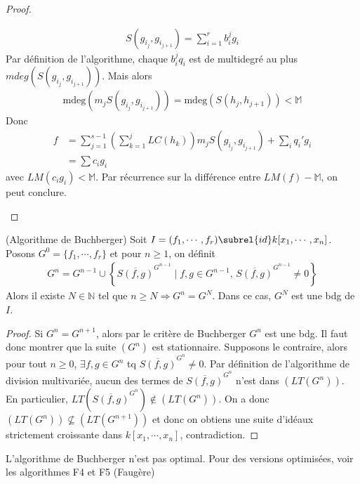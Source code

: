 \begin{proof}
\begin{enumerate}
                \begin{align*}
                    S(g_{i_j}, g_{i_{j+1}}) = \sum_{i = 1}^r b_i^jg_i
                \end{align*}
                Par définition de l'algorithme, chaque $b_i^jq_i$ est de multidegré au plus $mdeg(S(g_{i_j}, g_{i_{j+1}}))$. Mais alors
                \begin{align*}
                    \mathrm{mdeg}(m_j S(g_{i_j}, g_{i_{j+1}})) = \mathrm{mdeg}(S(h_j,h_{j+1})) < \mathbb{M}
                \end{align*}
                Donc
                \begin{align*}
                    f &= \sum_{j = 1}^{s-1} \left(\sum_{k = 1}^j LC(h_k) \right) m_j S(g_{i_j},g_{i_{j+1}}) + \sum_i q_i'g_i \\        
                    &= \sum c_ig_i                
                \end{align*}
                avec $LM(c_ig_i) < \mathbb{M}$. Par récurrence sur la différence entre $LM(f) - \mathbb{M}$, on peut conclure.
            \end{enumerate}
        \end{proof}
        \begin{coro} (Algorithme de Buchberger)
            Soit $I = (f_1, \cdots, f_r) \subrel{id} k[x_1, \cdots, x_n]$. Posons $G^0 = \{f_1, \cdots, f_r\}$ et pour $n \geq 1$, on définit
            \begin{align*}
                G^n = G^{n-1} \cup \left\{\overline{S(f,g)}^{G^{n-1}} \mid f,g \in G^{n-1},\, \overline{S(f,g)}^{G^{n-1}} \neq 0\right\} 
            \end{align*}
            Alors il existe $N \in \mathbb{N}$ tel que $n \geq N \Rightarrow G^n = G^N$. Dans ce cas, $G^N$ est une bdg de $I$.
        \end{coro}
        \begin{proof}
            Si $G^n = G^{n+1}$, alors par le critère de Buchberger $G^n$ est une bdg. Il faut donc montrer que la suite $(G^n)$ est stationnaire. Supposons le contraire, alors pour tout $n \geq 0$, $\exists f,g \in G^n$ tq $\overline{S(f,g)}^{G^n} \neq 0$. Par définition de l'algorithme de division multivariée, aucun des termes de $\overline{S(f,g)}^{G^n}$ n'est dans $(LT(G^n))$. En particulier, $LT(\overline{S(f,g)}^{G^n}) \notin (LT(G^n))$. On a donc $(LT(G^n)) \nsubseteq (LT(G^{n+1}))$ et donc on obtiens une suite d'idéaux strictement croissante dans $k[x_1, \cdots, x_n]$, contradiction.
        \end{proof}
        \begin{remq}
            L'algorithme de Buchberger n'est pas optimal. Pour des versions optimisées, voir les algorithmes F4 et F5 (Faugère)
        \end{remq}

